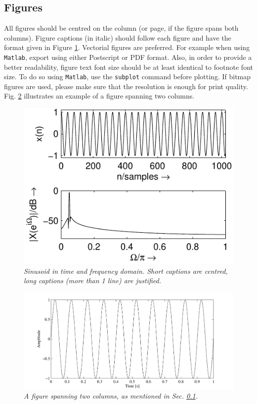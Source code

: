\documentclass[twoside,a4paper]{article}
\begin{document}
\subsection{Figures}
\label{ssec:figures}
All figures should be centred on the column (or page, if the figure spans both columns).
Figure captions (in italic) should follow each figure and have the format given in Figure \ref{fft_plot}.
%
Vectorial figures are preferred. For example when using
\texttt{Matlab}, export using either Postscript or PDF format. Also,
in order to provide a better readability, figure text font size
should be at least identical to footnote font size. To do so using
\texttt{Matlab}, use the \texttt{subplot} command before plotting.
If bitmap figures are used, please make sure that the resolution is
enough for print quality. Fig. \ref{ftt_plot2} illustrates an
example of a figure spanning two columns.
%
\begin{figure}[ht]
  \centerline{\includegraphics[scale=0.8]{fft_plot2}}
  \caption{\label{fft_plot}{\it Sinusoid in time and frequency domain. Short captions are centred, long captions (more than 1 line) are justified.}}
\end{figure}
%
\begin{figure}[ht]
  \center
  \includegraphics[width=5in]{TwoColumnSine2}
  \caption{\label{ftt_plot2}{\it A figure spanning two columns, as mentioned in Sec. \ref{ssec:figures}. }}
\end{figure}
\end{document}
